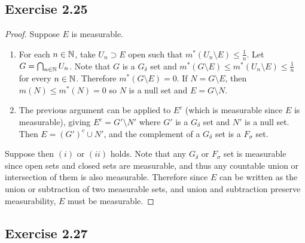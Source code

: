 \documentclass[hw_all.tex]{subfiles}
\begin{document}
\subsection{Exercise 2.25}

\begin{proof}
    Suppose $E$ is measurable.
    \begin{enumerate}
        \item
            For each $n \in \mathbb{N}$, take $U_n \supset E$ open such that $m^*(U_n \setminus E) \leq \frac{1}{n}$. Let $G = \bigcap_{n \in \mathbb{N}} U_n$. Note that $G$ is a $G_{\delta}$ set and $m^*(G \setminus E) \leq m^*(U_n \setminus E) \leq \frac{1}{n}$ for every $n \in \mathbb{N}$. Therefore $m^*(G \setminus E) = 0$. If $N = G \setminus E$, then $m(N) \leq m^*(N) = 0$ so $N$ is a null set and $E = G \setminus N$.
            
        \item
            The previous argument can be applied to $E^c$ (which is measurable since $E$ is measurable), giving $E^c = G' \setminus N'$ where $G'$ is a $G_{\delta}$ set and $N'$ is a null set. Then $E = (G')^c \cup N'$, and the complement of a $G_{\delta}$ set is a $F_{\sigma}$ set.
    \end{enumerate}

    Suppose then $(i)$ or $(ii)$ holds. Note that any $G_{\delta}$ or $F_{\sigma}$ set is measurable since open sets and closed sets are measurable, and thus any countable union or intersection of them is also measurable. Therefore since $E$ can be written as the union or subtraction of two measurable sets, and union and subtraction preserve measurability, $E$ must be measurable.
\end{proof}

\subsection{Exercise 2.27}
\end{document}
